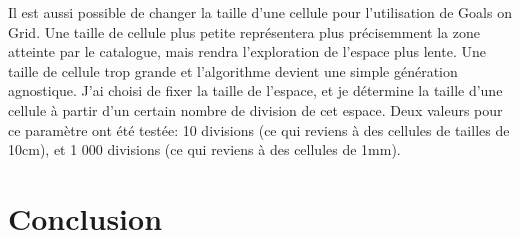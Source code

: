 \documentclass[11pt,french]{report}
\begin{document}
Il est aussi possible de changer la taille d'une cellule pour l'utilisation de Goals on Grid.
Une taille de cellule plus petite représentera plus précisemment la zone atteinte par le catalogue, mais rendra l'exploration de l'espace plus lente.
Une taille de cellule trop grande et l'algorithme devient une simple génération agnostique.
J'ai choisi de fixer la taille de l'espace, et je détermine la taille d'une cellule à partir d'un certain nombre de division de cet espace.
Deux valeurs pour ce paramètre ont été testée: 10 divisions (ce qui reviens à des cellules de tailles de 10cm), et 1 000 divisions (ce qui reviens à des cellules de 1mm).

\chapter{Conclusion}




\end{document}
